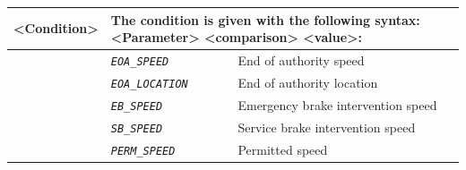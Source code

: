 \documentclass{template/openetcs}
\begin{document}
\begin{itemize}
\begin{longtable}{|l|l|l|}
			\hline
			
				\multirow{1}{*}{ \begin{minipage}[t]{0.22\linewidth} \textbf{<Condition>} \end{minipage} }
			&	\multicolumn{2}{l|}{ \begin{minipage}[t]{0.78\linewidth} The condition is given with the following syntax: <Parameter> <comparison> <value>: \end{minipage} } \\
			
			\hline
			 			 
			&	\begin{minipage}[t]{0.40\linewidth} \emph{\texttt{EOA\_SPEED}} \end{minipage}
			&	\begin{minipage}[t]{0.38\linewidth} End of authority speed \end{minipage} \\
			
			\hline
			
			&	\begin{minipage}[t]{0.40\linewidth} \emph{\texttt{EOA\_LOCATION}} \end{minipage}
			&	\begin{minipage}[t]{0.38\linewidth} End of authority location \end{minipage} \\
			
			\hline
			
			&	\begin{minipage}[t]{0.40\linewidth} \emph{\texttt{EB\_SPEED}} \end{minipage}
			&	\begin{minipage}[t]{0.38\linewidth} Emergency brake intervention speed \end{minipage} \\
			
			\hline
			
			&	\begin{minipage}[t]{0.40\linewidth} \emph{\texttt{SB\_SPEED}} \end{minipage}
			&	\begin{minipage}[t]{0.38\linewidth} Service brake intervention speed \end{minipage} \\
			
			\hline
			
			&	\begin{minipage}[t]{0.40\linewidth} \emph{\texttt{PERM\_SPEED}} \end{minipage}
			&	\begin{minipage}[t]{0.38\linewidth}Permitted speed \end{minipage} \\
			

\end{longtable}
\end{itemize}
\end{document}
